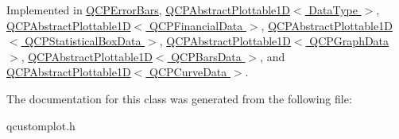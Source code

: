 Implemented in \hyperlink{classQCPErrorBars_af75958b95d9b9c7edfd9851c1d123850}{Q\+C\+P\+Error\+Bars}, \hyperlink{classQCPAbstractPlottable1D_afe0d56e39cc076032922f059b304c092}{Q\+C\+P\+Abstract\+Plottable1\+D$<$ Data\+Type $>$}, \hyperlink{classQCPAbstractPlottable1D_afe0d56e39cc076032922f059b304c092}{Q\+C\+P\+Abstract\+Plottable1\+D$<$ Q\+C\+P\+Financial\+Data $>$}, \hyperlink{classQCPAbstractPlottable1D_afe0d56e39cc076032922f059b304c092}{Q\+C\+P\+Abstract\+Plottable1\+D$<$ Q\+C\+P\+Statistical\+Box\+Data $>$}, \hyperlink{classQCPAbstractPlottable1D_afe0d56e39cc076032922f059b304c092}{Q\+C\+P\+Abstract\+Plottable1\+D$<$ Q\+C\+P\+Graph\+Data $>$}, \hyperlink{classQCPAbstractPlottable1D_afe0d56e39cc076032922f059b304c092}{Q\+C\+P\+Abstract\+Plottable1\+D$<$ Q\+C\+P\+Bars\+Data $>$}, and \hyperlink{classQCPAbstractPlottable1D_afe0d56e39cc076032922f059b304c092}{Q\+C\+P\+Abstract\+Plottable1\+D$<$ Q\+C\+P\+Curve\+Data $>$}.



The documentation for this class was generated from the following file\+:\begin{DoxyCompactItemize}
\item 
qcustomplot.\+h\end{DoxyCompactItemize}
